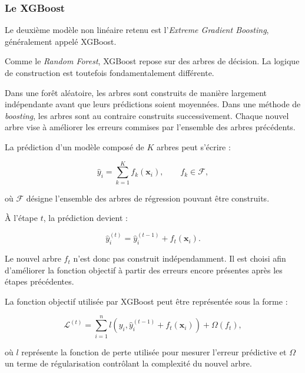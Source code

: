 \subsubsection{Le XGBoost}

Le deuxième modèle non linéaire retenu est l'\textit{Extreme Gradient Boosting}, généralement appelé XGBoost.

Comme le \textit{Random Forest}, XGBoost repose sur des arbres de décision. La logique de construction est toutefois fondamentalement différente.

Dans une forêt aléatoire, les arbres sont construits de manière largement indépendante avant que leurs prédictions soient moyennées. Dans une méthode de \textit{boosting}, les arbres sont au contraire construits successivement. Chaque nouvel arbre vise à améliorer les erreurs commises par l'ensemble des arbres précédents.

La prédiction d'un modèle composé de $K$ arbres peut s'écrire :

\begin{equation}
    \widehat{y}_i
    =
    \sum_{k=1}^{K}
    f_k(\mathbf{x}_i),
    \qquad
    f_k \in \mathcal{F},
    \label{eq:xgb_sum}
\end{equation}

où $\mathcal{F}$ désigne l'ensemble des arbres de régression pouvant être construits.

À l'étape $t$, la prédiction devient :

\begin{equation}
    \widehat{y}_i^{(t)}
    =
    \widehat{y}_i^{(t-1)}
    +
    f_t(\mathbf{x}_i).
\end{equation}

Le nouvel arbre $f_t$ n'est donc pas construit indépendamment. Il est choisi afin d'améliorer la fonction objectif à partir des erreurs encore présentes après les étapes précédentes.

La fonction objectif utilisée par XGBoost peut être représentée sous la forme :

\begin{equation}
    \mathcal{L}^{(t)}
    =
    \sum_{i=1}^{n}
    l
    \left(
    y_i,
    \widehat{y}_i^{(t-1)}
    +
    f_t(\mathbf{x}_i)
    \right)
    +
    \Omega(f_t),
    \label{eq:xgb_obj}
\end{equation}

où $l$ représente la fonction de perte utilisée pour mesurer l'erreur prédictive et $\Omega$ un terme de régularisation contrôlant la complexité du nouvel arbre.

